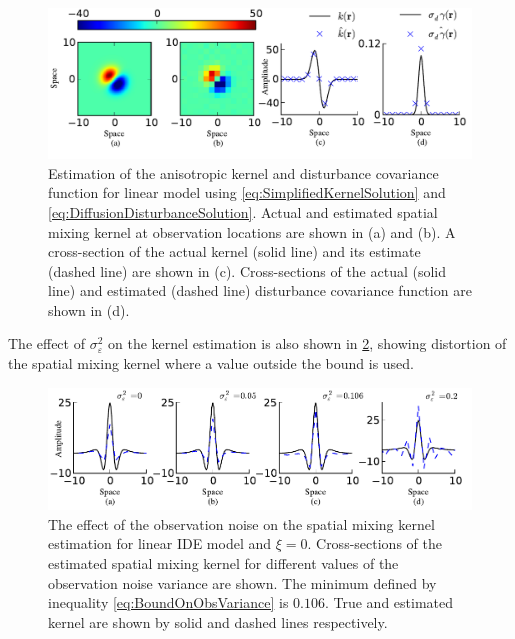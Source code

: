 \documentclass[10pt,twocolumn,twoside]{IEEEtran}
\begin{document}
{\begin{figure}[h]
	\centering
		\includegraphics[scale=1]{./Graph/DisturbanceKernelEstimationLinearAniso.pdf}
	\caption{Estimation of the anisotropic kernel and disturbance covariance function for linear model using \eqref{eq:SimplifiedKernelSolution} and \eqref{eq:DiffusionDisturbanceSolution}. Actual and  estimated spatial mixing kernel at observation locations are shown in (a) and (b).  A cross-section of the actual kernel (solid line) and its estimate  (dashed line) are shown in (c). Cross-sections of the actual (solid line) and estimated (dashed line) disturbance covariance function are shown in (d).}
	\label{fig:DifussionAniso}
\end{figure}  
The effect of $\sigma_{\varepsilon}^2$ on the kernel estimation is also shown in \figurename{\ref{fig:ObservationNoiseEffectonLinearIDE}}, showing distortion of the spatial mixing kernel where a value outside the bound is used.
\begin{figure}[h]
	\centering
		\includegraphics[scale=1]{./Graph/NoiseEffectIsoKernel.pdf}
	\caption{The effect of the observation noise on the spatial mixing kernel estimation for linear IDE model and $\xi=0$. Cross-sections of the estimated spatial mixing kernel for different values of the observation noise variance are shown. The minimum defined by inequality \eqref{eq:BoundOnObsVariance} is $0.106$. True and estimated kernel are shown by solid and dashed lines respectively.}
	\label{fig:ObservationNoiseEffectonLinearIDE}
\end{figure}


}
\end{document}
